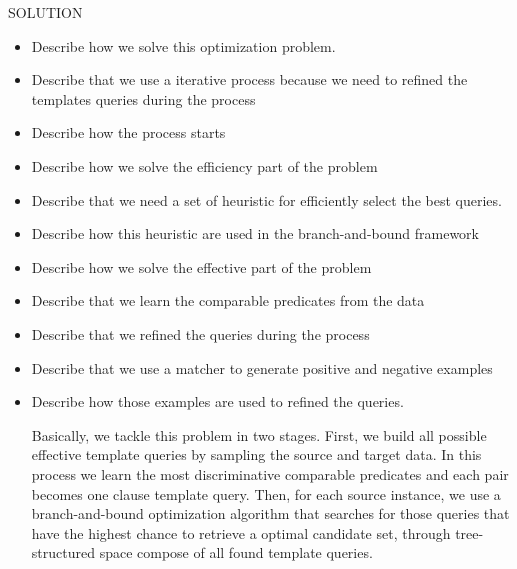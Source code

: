 SOLUTION

\begin{itemize}

\item Describe how we solve this optimization problem. 
\item Describe that we use a iterative process because we need to refined the templates queries during the process

\item Describe how the process starts
\item Describe how we solve the efficiency part of the problem
\item Describe that we need a set of heuristic for efficiently select the best queries.
\item Describe how this heuristic are used in the branch-and-bound framework

\item Describe how we solve the effective part of the problem
\item Describe that we learn the comparable predicates from the data
\item Describe that we refined the queries during the process
\item Describe that we use a matcher to generate positive and negative examples
\item Describe how those examples are used to refined the queries. 

 

Basically, we tackle this problem in two stages. First, we build all possible effective template queries by sampling the source and target data. In this process we learn the most discriminative comparable predicates and each pair becomes one clause template query. Then, for each source instance, we use a branch-and-bound optimization algorithm that searches for those queries that have the highest chance to retrieve a optimal candidate set, through tree-structured space compose of all found template queries. 


\end{itemize}
